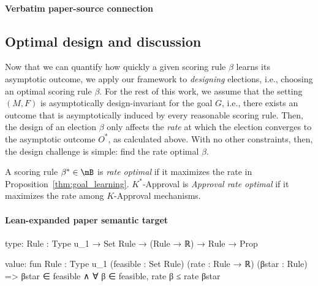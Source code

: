 \documentclass[10pt]{article}
\begin{document}
\paragraph{Verbatim paper-source connection}
\begin{ReviewVerbatim}
\subsection{Optimal design and discussion}
Now that we can quantify how quickly a given scoring rule $\beta$ learns its asymptotic outcome, we apply our framework to \textit{designing} elections, i.e., choosing an optimal scoring rule $\beta$. For the rest of this work, we assume that the setting $(M,F)$ is asymptotically design-invariant for the goal $G$, i.e., there exists an outcome that is asymptotically induced by every reasonable scoring rule. Then, the design of an election $\beta$ only affects the \textit{rate} at which the election converges to the asymptotic outcome $O^*$, as calculated above. With no other constraints, then, the design challenge is simple: find the rate optimal $\beta$.
\begin{definition}
	A scoring rule $\beta^* \in \mB$ is \textit{rate optimal} if it maximizes the rate in Proposition~\ref{thm:goal_learning}. %
	$K^*$-Approval is \textit{Approval rate optimal} if it maximizes the rate among $K$-Approval mechanisms.
\end{definition}
\end{ReviewVerbatim}



\paragraph{Lean-expanded paper semantic target}
\begin{ReviewVerbatim}
type:
{Rule : Type u_1} → Set Rule → (Rule → ℝ) → Rule → Prop

value:
fun {Rule : Type u_1} (feasible : Set Rule) (rate : Rule → ℝ) (βstar : Rule) =>
  βstar ∈ feasible ∧ ∀ β ∈ feasible, rate β ≤ rate βstar
\end{ReviewVerbatim}
\end{document}
